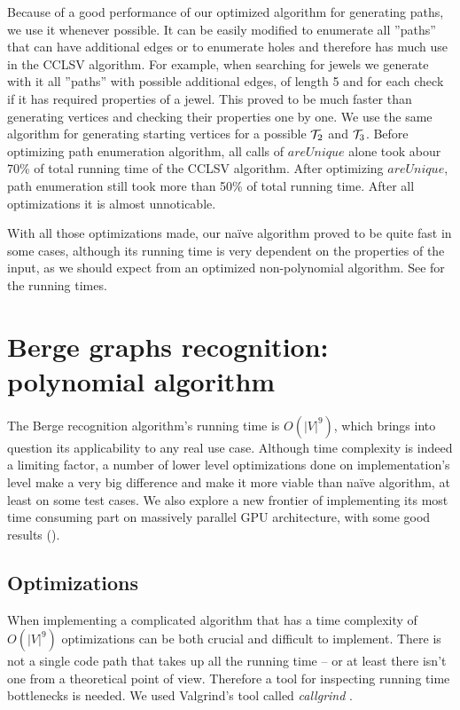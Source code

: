 Because of a good performance of our optimized algorithm for generating paths, we use it whenever possible. It can be easily modified to enumerate all ''paths'' that can have additional edges or to enumerate holes and therefore has much use in the CCLSV algorithm. For example, when searching for jewels we generate with it all ''paths'' with possible additional edges, of length 5 and for each check if it has required properties of a jewel. This proved to be much faster than generating vertices and checking their properties one by one. We use the same algorithm for generating starting vertices for a possible $\mathcal{T}_2$ and $\mathcal{T}_3$. Before optimizing path enumeration algorithm, all calls of $areUnique$ alone took abour 70\% of total running time of the CCLSV algorithm. After optimizing $areUnique$, path enumeration still took more than 50\% of total running time. After all optimizations it is almost unnoticable.

With all those optimizations made, our na\"ive algorithm proved to be quite fast in some cases, although its running time is very dependent on the properties of the input, as we should expect from an optimized non-polynomial algorithm. See  for the running times.

\section{Berge graphs recognition: polynomial algorithm}

The Berge recognition algorithm's running time is $O(|V|^9)$, which brings into question its applicability to any real use case. Although time complexity is indeed a limiting factor, a number of lower level optimizations done on implementation's level make a very big difference and make it more viable than na\"ive algorithm, at least on some test cases. We also explore a new frontier of implementing its most time consuming part on massively parallel GPU architecture, with some good results ().

\subsection{Optimizations}
\label{sec:Optimizations}

When implementing a complicated algorithm that has a time complexity of $O(|V|^9)$ optimizations can be both crucial and difficult to implement. There is not a single code path that takes up all the running time -- or at least there isn't one from a theoretical point of view. Therefore a tool for inspecting running time bottlenecks is needed. We used Valgrind's tool called \emph{callgrind} \cite{callgrind}.

